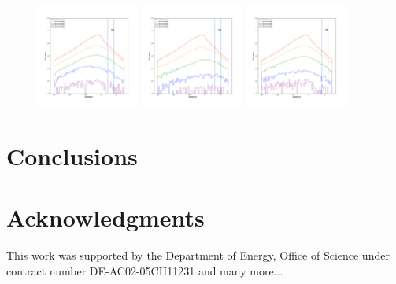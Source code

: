 \documentclass[12pt,prd]{article}
\begin{document}
\begin{figure}[h!]
\includegraphics[width=0.3\textwidth]{../figures/scanning_plotsgaiascan_l101_2_b58_4_ra212_7_dec55_2_npy_15.pdf}
\includegraphics[width=0.3\textwidth]{../figures/scanning_plotsgaiascan_l101_2_b58_4_ra212_7_dec55_2_npy_16.pdf}
\includegraphics[width=0.3\textwidth]{../figures/scanning_plotsgaiascan_l101_2_b58_4_ra212_7_dec55_2_npy_17.pdf}
\end{figure}


\section{Conclusions} \label{sec:conclusions}


\section*{\label{sec::acknowledgments}Acknowledgments}

This work was supported by the Department of Energy, Office of Science under contract number DE-AC02-05CH11231 and many more...



\end{document}
